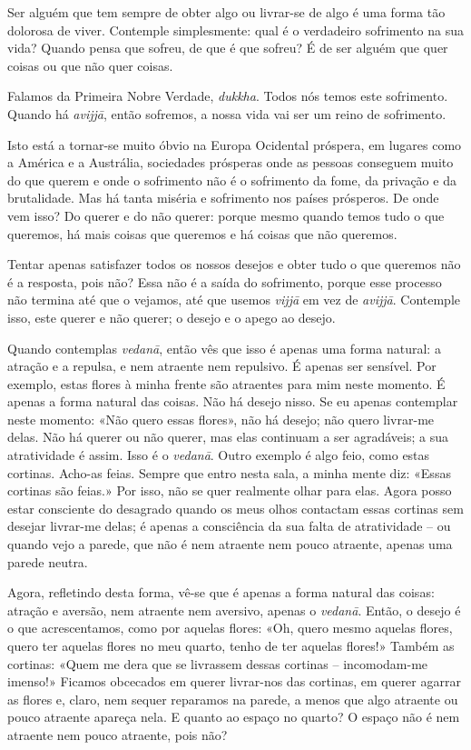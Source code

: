 Ser alguém que tem sempre de obter algo ou livrar-se de algo é uma forma tão
dolorosa de viver. Contemple simplesmente: qual é o verdadeiro sofrimento na sua
vida? Quando pensa que sofreu, de que é que sofreu? É de ser alguém que quer
coisas ou que não quer coisas.

Falamos da Primeira Nobre Verdade, \emph{dukkha}. Todos nós temos este
sofrimento. Quando há \emph{avijjā}, então sofremos, a nossa vida vai ser um
reino de sofrimento.

Isto está a tornar-se muito óbvio na Europa Ocidental próspera, em lugares como
a América e a Austrália, sociedades prósperas onde as pessoas conseguem muito do
que querem e onde o sofrimento não é o sofrimento da fome, da privação e da
brutalidade. Mas há tanta miséria e sofrimento nos países prósperos. De onde vem
isso? Do querer e do não querer: porque mesmo quando temos tudo o que queremos,
há mais coisas que queremos e há coisas que não queremos.

Tentar apenas satisfazer todos os nossos desejos e obter tudo o que queremos não
é a resposta, pois não? Essa não é a saída do sofrimento, porque esse processo
não termina até que o vejamos, até que usemos \emph{vijjā} em vez de
\emph{avijjā}. Contemple isso, este querer e não querer; o desejo e o apego ao
desejo.

Quando contemplas \emph{vedanā}, então vês que isso é apenas uma forma natural:
a atração e a repulsa, e nem atraente nem repulsivo. É apenas ser sensível. Por
exemplo, estas flores à minha frente são atraentes para mim neste momento. É
apenas a forma natural das coisas. Não há desejo nisso. Se eu apenas contemplar
neste momento: «Não quero essas flores», não há desejo; não quero livrar-me
delas. Não há querer ou não querer, mas elas continuam a ser agradáveis; a sua
atratividade é assim. Isso é o \emph{vedanā}. Outro exemplo é algo feio, como
estas cortinas. Acho-as feias. Sempre que entro nesta sala, a minha mente diz:
«Essas cortinas são feias.» Por isso, não se quer realmente olhar para elas.
Agora posso estar consciente do desagrado quando os meus olhos contactam essas
cortinas sem desejar livrar-me delas; é apenas a consciência da sua falta de
atratividade -- ou quando vejo a parede, que não é nem atraente nem pouco
atraente, apenas uma parede neutra.

Agora, refletindo desta forma, vê-se que é apenas a forma natural das coisas:
atração e aversão, nem atraente nem aversivo, apenas o \emph{vedanā}. Então, o
desejo é o que acrescentamos, como por aquelas flores: «Oh, quero mesmo aquelas
flores, quero ter aquelas flores no meu quarto, tenho de ter aquelas flores!»
Também as cortinas: «Quem me dera que se livrassem dessas cortinas --
incomodam-me imenso!» Ficamos obcecados em querer livrar-nos das cortinas, em
querer agarrar as flores e, claro, nem sequer reparamos na parede, a menos que
algo atraente ou pouco atraente apareça nela. E quanto ao espaço no quarto? O
espaço não é nem atraente nem pouco atraente, pois não?

